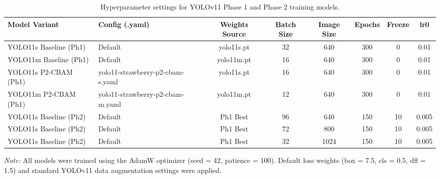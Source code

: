\documentclass{article}
\begin{document}
\begin{table}[htbp]
\centering
\caption{Hyperparameter settings for YOLOv11 Phase 1 and Phase 2 training models.}
\label{tab:yolo_hyperparameters}
\begin{threeparttable}
\small 

\setlength{\tabcolsep}{5pt}
\begin{tabular}{llcccccc}
\toprule
\textbf{Model Variant} & \textbf{Config (.yaml)} & \textbf{Weights Source} & \textbf{Batch Size} & \textbf{Image Size} & \textbf{Epochs} & \textbf{Freeze} & \textbf{lr0} \\
\midrule
YOLO11s Baseline (Ph1) & Default & yolo11s.pt & 32 & 640 & 300 & 0 & 0.01 \\
YOLO11m Baseline (Ph1) & Default & yolo11m.pt & 16 & 640 & 300 & 0 & 0.01 \\
YOLO11s P2-CBAM (Ph1)  & yolo11-strawberry-p2-cbam-s.yaml & yolo11s.pt & 16 & 640 & 300 & 0 & 0.01 \\
YOLO11m P2-CBAM (Ph1)  & yolo11-strawberry-p2-cbam-m.yaml & yolo11m.pt & 12 & 640 & 300 & 0 & 0.01 \\
\midrule
YOLO11s Baseline (Ph2) & Default & Ph1 Best & 96 & 640 & 150 & 10 & 0.005 \\
YOLO11s Baseline (Ph2) & Default & Ph1 Best & 72 & 800 & 150 & 10 & 0.005 \\
YOLO11s Baseline (Ph2) & Default & Ph1 Best & 32 & 1024 & 150 & 10 & 0.005 \\
\bottomrule
\end{tabular}

\begin{tablenotes}
\small
\item \textit{Note:} All models were trained using the AdamW optimizer (seed = 42, patience = 100). Default loss weights (box = 7.5, cls = 0.5, dfl = 1.5) and standard YOLOv11 data augmentation settings were applied.
\end{tablenotes}
\end{threeparttable}
\end{table}
\end{document}
